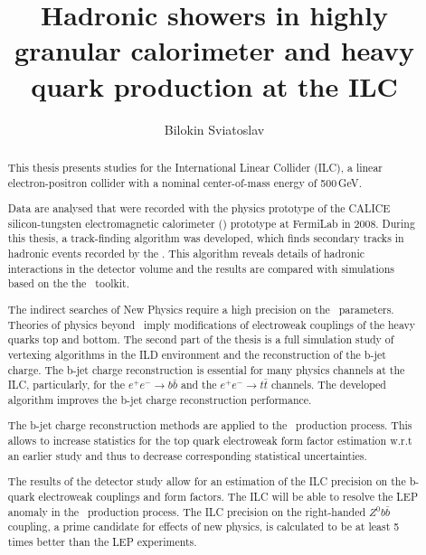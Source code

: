 \documentclass[a4paper, 12pt]{article}
\title{Hadronic showers in highly granular calorimeter and heavy quark production at the ILC}
\author{Bilokin Sviatoslav}
\begin{document}
\maketitle
\begin{abstract}

This thesis presents studies for the International Linear Collider (ILC), a linear electron-positron collider with a nominal center-of-mass energy of 500\,GeV.

Data are analysed that were recorded with the physics prototype of the CALICE silicon-tungsten electromagnetic calorimeter (\ecal) prototype at FermiLab in 2008. During this thesis, a track-finding algorithm was developed, which finds secondary tracks in hadronic events recorded by the \ecalp. This algorithm reveals details of hadronic interactions in the detector volume and the results are compared with simulations based on the the \geant\ toolkit.

The indirect searches of New Physics require a high precision on the \sm\ parameters. Theories of physics beyond \sm\ imply modifications of electroweak couplings of the heavy quarks top and bottom. The second part of the thesis is a full simulation study of vertexing algorithms in the ILD environment and the reconstruction of the b-jet charge. The b-jet charge reconstruction is essential for many physics channels at the ILC, particularly, for the $e^+e^-\to b\bar{b}$ and the $e^+e^-\to t\bar{t}$ channels.
The developed algorithm improves the b-jet charge reconstruction performance.

The b-jet charge reconstruction methods are applied to the \ttbar\ production process. This allows to increase statistics for the top quark electroweak form factor estimation w.r.t an earlier study and thus to decrease corresponding statistical uncertainties.

The results of the detector study allow for an estimation of the ILC precision on the b-quark electroweak couplings and form factors. The ILC will be able to resolve the LEP anomaly in the \bbbar\ production process. The ILC precision on the right-handed $Z^0b\bar{b}$ coupling, a prime candidate for effects of new physics, is calculated to be at least 5 times better than the LEP experiments. 
\end{abstract}
\tableofcontents
\linenumbers
%
%
%
%


%
% 
\end{document}
